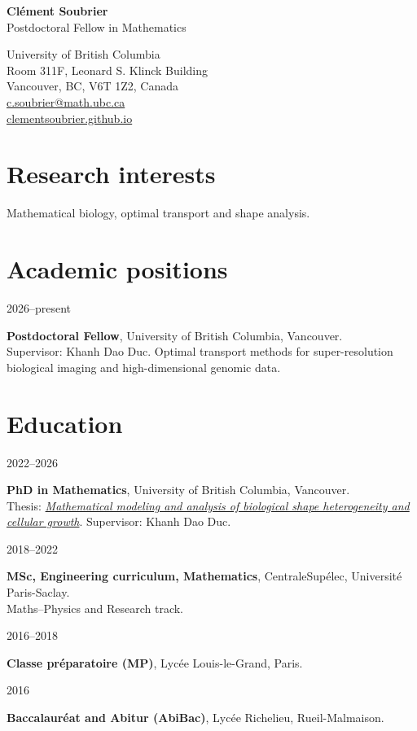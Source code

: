 \documentclass[10pt,a4paper]{article}
\newcommand{\entry}[2]{%
  \noindent\parbox[t]{3cm}{\raggedright\strut #1}%
  \parbox[t]{\dimexpr\linewidth-3cm}{#2}\par\vspace{0.35em}}
\begin{document}
\noindent
\begin{minipage}[t]{0.45\linewidth}\vspace{0pt}
  {\LARGE\bfseries Clément Soubrier}\\[0.4em]
  {\large\color{accent} Postdoctoral Fellow in Mathematics}
\end{minipage}%
\hfill
\begin{minipage}[t]{0.53\linewidth}\vspace{0pt}
  \raggedleft\small
  University of British Columbia\\
  Room 311F, Leonard S. Klinck Building\\
  Vancouver, BC, V6T 1Z2, Canada\\
  \href{mailto:c.soubrier@math.ubc.ca}{c.soubrier@math.ubc.ca}\\
  \href{https://clementsoubrier.github.io}{clementsoubrier.github.io}
\end{minipage}
\vspace{0.5em}

\section{Research interests}
Mathematical biology, optimal transport and shape analysis.

\section{Academic positions}
\entry{2026--present}{\textbf{Postdoctoral Fellow}, University of British Columbia, Vancouver.\\
  Supervisor: Khanh Dao Duc. Optimal transport methods for super-resolution biological imaging and high-dimensional genomic data.}

\section{Education}
\entry{2022--2026}{\textbf{PhD in Mathematics}, University of British Columbia, Vancouver.\\
  Thesis: \emph{\href{https://open.library.ubc.ca/soa/cIRcle/collections/ubctheses/24/items/1.0456115}{Mathematical modeling and analysis of biological shape heterogeneity and cellular growth}}. Supervisor: Khanh Dao Duc.}
\entry{2018--2022}{\textbf{MSc, Engineering curriculum, Mathematics}, CentraleSupélec, Université Paris-Saclay.\\
  Maths--Physics and Research track. }
\entry{2016--2018}{\textbf{Classe préparatoire (MP)}, Lycée Louis-le-Grand, Paris.}
\entry{2016}{\textbf{Baccalauréat and Abitur (AbiBac)}, Lycée Richelieu, Rueil-Malmaison.}
\end{document}
